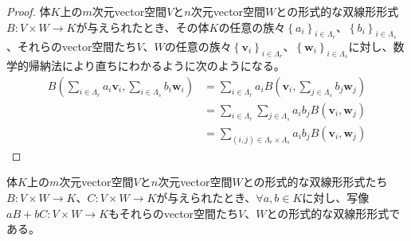 \documentclass[dvipdfmx]{jsarticle}
\begin{document}
\begin{proof}
体$K$上の$m$次元vector空間$V$と$n$次元vector空間$W$との形式的な双線形形式$B:V \times W \rightarrow K$が与えられたとき、その体$K$の任意の族々$\left\{ a_{i} \right\}_{i \in \varLambda_{r}}$、$\left\{ b_{i} \right\}_{i \in \varLambda_{s}}$、それらのvector空間たち$V$、$W$の任意の族々$\left\{ \mathbf{v}_{i} \right\}_{i \in \varLambda_{r}}$、$\left\{ \mathbf{w}_{i} \right\}_{i \in \varLambda_{s}}$に対し、数学的帰納法により直ちにわかるように次のようになる。
\begin{align*}
B\left( \sum_{i \in \varLambda_{r}} {a_{i}\mathbf{v}_{i}},\sum_{i \in \varLambda_{s}} {b_{i}\mathbf{w}_{i}} \right) &= \sum_{i \in \varLambda_{r}} {a_{i}B\left( \mathbf{v}_{i},\sum_{j \in \varLambda_{s}} {b_{j}\mathbf{w}_{j}} \right)}\\
&= \sum_{i \in \varLambda_{r}} {\sum_{j \in \varLambda_{s}} {a_{i}b_{j}B\left( \mathbf{v}_{i},\mathbf{w}_{j} \right)}}\\
&= \sum_{(i,j) \in \varLambda_{r} \times \varLambda_{s}} {a_{i}b_{j}B\left( \mathbf{v}_{i},\mathbf{w}_{j} \right)}
\end{align*}
\end{proof}
\begin{thm}\label{2.4.3.2}
体$K$上の$m$次元vector空間$V$と$n$次元vector空間$W$との形式的な双線形形式たち$B:V \times W \rightarrow K$、$C:V \times W \rightarrow K$が与えられたとき、$\forall a,b \in K$に対し、写像$aB + bC:V \times W \rightarrow K$もそれらのvector空間たち$V$、$W$との形式的な双線形形式である。
\end{thm}
\end{document}

